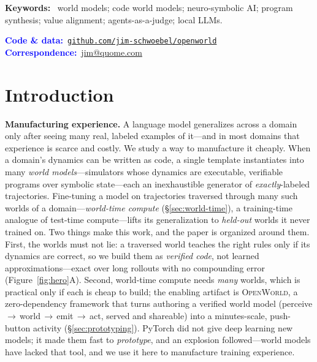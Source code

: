 \documentclass[11pt]{article}
\newcommand{\openworld}{\textsc{OpenWorld}}
\begin{document}
\begin{tcolorbox}[breakable, enhanced jigsaw, colback=black!4, colframe=black!4,
  arc=5pt, boxrule=0pt, left=16pt, right=16pt, top=10pt, bottom=10pt]
\medskip
\noindent\textbf{Keywords:}~%
world models; code world models; neuro-symbolic AI; program synthesis;
value alignment; agents-as-a-judge; local LLMs.

\medskip
\noindent\textcolor{blue}{\textbf{Code \& data:}}~\href{https://github.com/jim-schwoebel/openworld}{\texttt{github.com/jim-schwoebel/openworld}}\\
\noindent\textcolor{blue}{\textbf{Correspondence:}}~\href{mailto:jim@quome.com}{jim@quome.com}
\end{tcolorbox}

\vspace{2pt}
\vspace{0.3em}

\section{Introduction}
\textbf{Manufacturing experience.} A language model generalizes across a domain only after
seeing many real, labeled examples of it---and in most domains that experience is scarce and
costly. We study a way to manufacture it cheaply. When a domain's dynamics can be written as
code, a single template instantiates into many \emph{world models}---simulators whose
dynamics are executable, verifiable programs over symbolic state---each an inexhaustible
generator of \emph{exactly}-labeled trajectories. Fine-tuning a model on trajectories
traversed through many such worlds of a domain---\emph{world-time compute}
(\S\ref{sec:world-time}), a training-time analogue of test-time compute---lifts its
generalization to \emph{held-out} worlds it never trained on. Two things make this work, and
the paper is organized around them. First, the worlds must not lie: a traversed world teaches
the right rules only if its dynamics are correct, so we build them as \emph{verified code},
not learned approximations---exact over long rollouts with no compounding error
(Figure~\ref{fig:hero}A). Second, world-time compute needs \emph{many} worlds, which is
practical only if each is cheap to build; the enabling artifact is \openworld{}, a
zero-dependency framework that turns authoring a verified world model
(perceive\,$\to$\,world\,$\to$\,emit\,$\to$\,act, served and shareable) into a minutes-scale,
push-button activity (\S\ref{sec:prototyping}). PyTorch did not give deep learning new
models; it made them fast to \emph{prototype}, and an explosion followed---world models have
lacked that tool, and we use it here to manufacture training experience.
\end{document}
